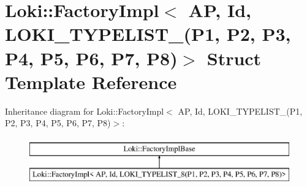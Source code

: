 \hypertarget{structLoki_1_1FactoryImpl_3_01AP_00_01Id_00_01LOKI__TYPELIST__8_07P1_00_01P2_00_01P3_00_01P4_00_116dd2045f78a9e7ca017de1cb74bcf4}{}\section{Loki\+:\+:Factory\+Impl$<$ A\+P, Id, L\+O\+K\+I\+\_\+\+T\+Y\+P\+E\+L\+I\+S\+T\+\_(P1, P2, P3, P4, P5, P6, P7, P8)$>$ Struct Template Reference}
\label{structLoki_1_1FactoryImpl_3_01AP_00_01Id_00_01LOKI__TYPELIST__8_07P1_00_01P2_00_01P3_00_01P4_00_116dd2045f78a9e7ca017de1cb74bcf4}
Inheritance diagram for Loki\+:\+:Factory\+Impl$<$ A\+P, Id, L\+O\+K\+I\+\_\+\+T\+Y\+P\+E\+L\+I\+S\+T\+\_(P1, P2, P3, P4, P5, P6, P7, P8)$>$\+:\begin{figure}[H]
\begin{center}
\leavevmode
\includegraphics[height=2.000000cm]{structLoki_1_1FactoryImpl_3_01AP_00_01Id_00_01LOKI__TYPELIST__8_07P1_00_01P2_00_01P3_00_01P4_00_116dd2045f78a9e7ca017de1cb74bcf4}
\end{center}
\end{figure}
